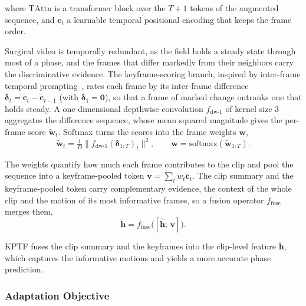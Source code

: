 \noindent where $\mathrm{TAttn}$ is a transformer block over the $T+1$ tokens of the augmented
sequence, and $\mathbf{e}_t$ a learnable temporal positional encoding that keeps the frame order.

Surgical video is temporally redundant, as the field holds a steady state through most of a phase, and
the frames that differ markedly from their neighbors carry the discriminative evidence.
The keyframe-scoring branch, inspired by inter-frame temporal prompting~\cite{liu2025stop},
rates each frame by its inter-frame difference
$\boldsymbol{\delta}_t = \tilde{\mathbf{c}}_t - \tilde{\mathbf{c}}_{t-1}$ (with
$\boldsymbol{\delta}_1=\mathbf{0}$), so that a frame of marked
change outranks one that holds steady.
A one-dimensional depthwise convolution $f_{\mathrm{dw}\text{-}1}$ of kernel size $3$ aggregates the
difference sequence, whose mean squared magnitude gives the per-frame score $\tilde{\mathbf{w}}_t$.
Softmax turns the scores into the frame weights $\mathbf{w}$,
\begin{equation}
  \tilde{\mathbf{w}}_t = \tfrac{1}{D}\big\| f_{\mathrm{dw}\text{-}1}(\boldsymbol{\delta}_{1:T})_t \big\|^{2}, \qquad
  \mathbf{w} = \mathrm{softmax}(\tilde{\mathbf{w}}_{1:T}).
\end{equation}

\noindent The weights quantify how much each frame contributes to the clip and pool the sequence into
a keyframe-pooled token $\mathbf{v} = \textstyle\sum_{t}w_{t}\tilde{\mathbf{c}}_{t}$.
The clip summary and the keyframe-pooled token carry complementary evidence, the context of the whole
clip and the motion of its most informative frames, so a fusion operator $f_{\mathrm{fuse}}$ merges
them,
\begin{equation}
  \tilde{\mathbf{h}} = f_{\mathrm{fuse}}\!\big([\hat{\mathbf{h}};\, \mathbf{v}]\big).
\end{equation}

KPTF fuses the clip summary and the keyframes into the clip-level feature $\tilde{\mathbf{h}}$, which
captures the informative motions and yields a more accurate phase prediction.

\subsubsection{Adaptation Objective}
\label{sec:method:video:loss}

